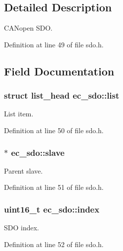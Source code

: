 \subsection{\-Detailed \-Description}
\-C\-A\-Nopen \-S\-D\-O. 

\-Definition at line 49 of file sdo.\-h.



\subsection{\-Field \-Documentation}
\subsubsection[{list}]{\setlength{\rightskip}{0pt plus 5cm}struct list\-\_\-head {\bf ec\-\_\-sdo\-::list}}\label{structec__sdo_a19e6bd6217318c1a84191ce3bc28ebca}


\-List item. 



\-Definition at line 50 of file sdo.\-h.

\subsubsection[{slave}]{$\ast$ {\bf ec\-\_\-sdo\-::slave}}\label{structec__sdo_abaa23035a820b5eaae49b95b98ef3985}


\-Parent slave. 



\-Definition at line 51 of file sdo.\-h.

\subsubsection[{index}]{\setlength{\rightskip}{0pt plus 5cm}uint16\-\_\-t {\bf ec\-\_\-sdo\-::index}}\label{structec__sdo_a1764ade2d1d34c8e0c8951ff4a809663}


\-S\-D\-O index. 



\-Definition at line 52 of file sdo.\-h.

